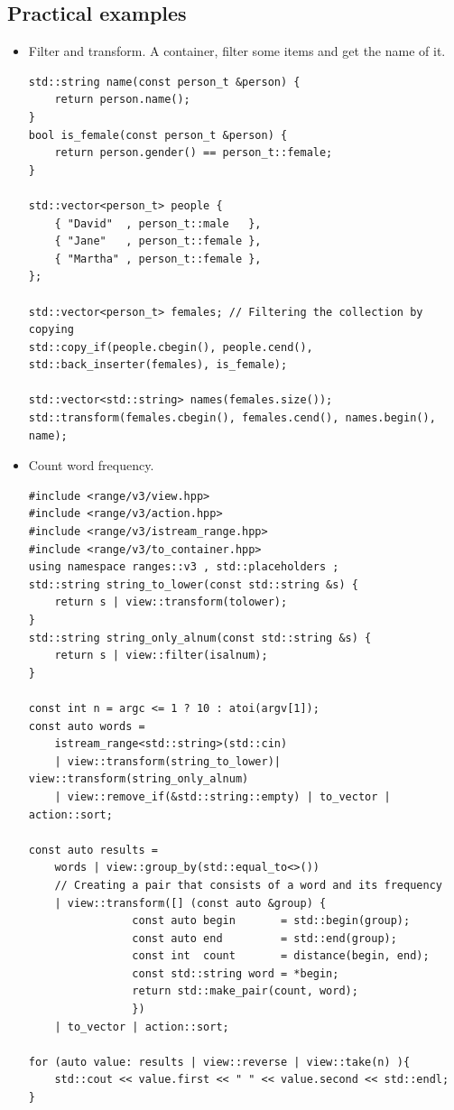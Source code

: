 \documentclass[a4paper,11pt,twoside]{book}
\begin{document}
\subsection{Practical examples}

\begin{itemize}
	
	\item Filter and transform. A container, filter some items and get the name of it.
\begin{lstlisting}
std::string name(const person_t &person) {
    return person.name();
}
bool is_female(const person_t &person) {
    return person.gender() == person_t::female;
}

std::vector<person_t> people {
	{ "David"  , person_t::male   },
	{ "Jane"   , person_t::female },
	{ "Martha" , person_t::female },
};

std::vector<person_t> females; // Filtering the collection by copying
std::copy_if(people.cbegin(), people.cend(), std::back_inserter(females), is_female);

std::vector<std::string> names(females.size());
std::transform(females.cbegin(), females.cend(), names.begin(), name);
\end{lstlisting}

	\item Count word frequency. 
\begin{lstlisting}
#include <range/v3/view.hpp>
#include <range/v3/action.hpp>
#include <range/v3/istream_range.hpp>
#include <range/v3/to_container.hpp>
using namespace ranges::v3 , std::placeholders ;
std::string string_to_lower(const std::string &s) {
    return s | view::transform(tolower);
}
std::string string_only_alnum(const std::string &s) {
    return s | view::filter(isalnum);
}

const int n = argc <= 1 ? 10 : atoi(argv[1]);
const auto words =
	istream_range<std::string>(std::cin)
	| view::transform(string_to_lower)| view::transform(string_only_alnum)
	| view::remove_if(&std::string::empty) | to_vector | action::sort;

const auto results =
	words | view::group_by(std::equal_to<>())
	// Creating a pair that consists of a word and its frequency
	| view::transform([] (const auto &group) {
				const auto begin       = std::begin(group);
				const auto end         = std::end(group);
				const int  count       = distance(begin, end);
				const std::string word = *begin;
				return std::make_pair(count, word);
				})                     
	| to_vector | action::sort;
           
for (auto value: results | view::reverse | view::take(n) ){
	std::cout << value.first << " " << value.second << std::endl;
}
\end{lstlisting}

\end{itemize}
\end{document}
